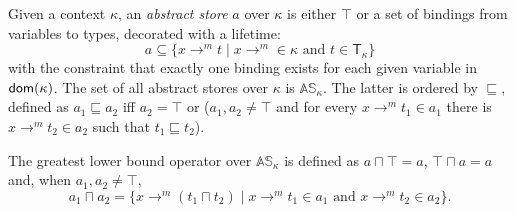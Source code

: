 \begin{definition}
  \label{def:abstract-store}
  Given a context $\kappa$, an \emph{abstract store} $a$ over $\kappa$ is either $\top$
  or a set of bindings from variables to types, decorated with a lifetime:
  \[
  a\subseteq\{x\to^m t\mid x\to^m\in\kappa\text{ and }t\in\mathsf{T_\kappa}\}
  \]
  with the constraint that exactly one binding exists for each given variable in $\mathsf{dom}(\kappa)$.
  The set of all abstract stores over $\kappa$ is $\mathbb{AS}_\kappa$.
  The latter is ordered by $\sqsubseteq$, defined as $a_1\sqsubseteq a_2$ iff $a_2=\top$ or
  ($a_1,a_2\not=\top$ and for every $x\to^mt_1\in a_1$ there is $x\to^mt_2\in a_2$
  such that $t_1\sqsubseteq t_2$).
\end{definition}

\begin{definition}
  The greatest lower bound operator over $\mathbb{AS}_\kappa$ is defined as
  $a\sqcap\top=a$, $\top\sqcap a=a$ and, when $a_1,a_2\not=\top$,
  \[
  a_1\sqcap a_2=\{x\to^m(t_1\sqcap t_2)\mid x\to^m t_1\in a_1\text{ and }x\to^m t_2\in a_2\}.
  \]
\end{definition}

